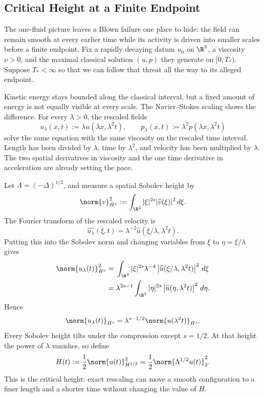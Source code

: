 
\subsection{Critical Height at a Finite Endpoint}\label{sub:CriticalHeightAtAFiniteEndpoint}

The one-fluid picture leaves a Blown failure one place to hide: the field can remain smooth at every earlier time while its activity is driven into smaller scales before a finite endpoint.
Fix a rapidly decaying datum \(u_0\) on \(\R^3\), a viscosity \(\nu>0\), and the maximal classical solution \((u,p)\) they generate on \([0,T_*)\).
Suppose \(T_*<\infty\) so that we can follow that threat all the way to its alleged endpoint.

Kinetic energy stays bounded along the classical interval, but a fixed amount of energy is not equally visible at every scale.
The Navier--Stokes scaling shows the difference.
For every \(\lambda>0\), the rescaled fields
\[
  u_\lambda(x,t)
  :=
  \lambda u(\lambda x,\lambda^2t),
  \qquad
  p_\lambda(x,t)
  :=
  \lambda^2p(\lambda x,\lambda^2t)
\]
solve the same equation with the same viscosity on the rescaled time interval.
Length has been divided by \(\lambda\), time by \(\lambda^2\), and velocity has been multiplied by \(\lambda\).
The two spatial derivatives in viscosity and the one time derivative in acceleration are already setting the pace.

Let \(\Lambda=(-\Delta)^{1/2}\), and measure a spatial Sobolev height by
\[
  \norm{v}_{\dot H^s}^2
  :=
  \int_{\R^3}
  |\xi|^{2s}|\widehat v(\xi)|^2
  \,d\xi.
\]
The Fourier transform of the rescaled velocity is
\[
  \widehat{u_\lambda}(\xi,t)
  =
  \lambda^{-2}
  \widehat u(\xi/\lambda,\lambda^2t).
\]
Putting this into the Sobolev norm and changing variables from \(\xi\) to \(\eta=\xi/\lambda\) gives
\begin{align*}
  \norm{u_\lambda(t)}_{\dot H^s}^2
  &={}
  \int_{\R^3}
  |\xi|^{2s}\lambda^{-4}
  \left|\widehat u(\xi/\lambda,\lambda^2t)\right|^2
  \,d\xi
  \\
  &={}
  \lambda^{2s-1}
  \int_{\R^3}
  |\eta|^{2s}
  \left|\widehat u(\eta,\lambda^2t)\right|^2
  \,d\eta.
\end{align*}
Hence
\[
  \norm{u_\lambda(t)}_{\dot H^s}
  =
  \lambda^{s-1/2}
  \norm{u(\lambda^2t)}_{\dot H^s}.
\]
Every Sobolev height tilts under the compression except \(s=1/2\).
At that height the power of \(\lambda\) vanishes, so define
\[
  H(t)
  :=
  \frac12\norm{u(t)}_{\dot H^{1/2}}^2
  =
  \frac12\norm{\Lambda^{1/2}u(t)}_2^2.
\]
This is the critical height: exact rescaling can move a smooth configuration to a finer length and a shorter time without changing the value of \(H\).

